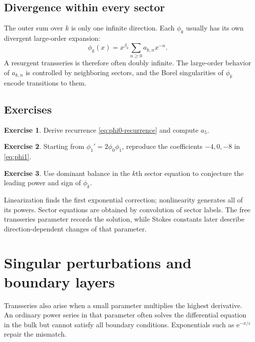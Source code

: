 \documentclass[11pt,openany]{book}
\theoremstyle{definition}
\newtheorem{exercise}{Exercise}[chapter]
\theoremstyle{plain}
\theoremstyle{remark}
\newcommand{\eps}{\varepsilon}
\newcommand{\e}{\mathrm{e}}
\begin{document}
\section{Divergence within every sector}

The outer sum over $k$ is only one infinite direction. Each $\phi_k$ usually has its own divergent large-order expansion:
\[
 \phi_k(x)=x^{\beta_k}\sum_{n\ge0}a_{k,n}x^{-n}.
\]
A resurgent transseries is therefore often doubly infinite. The large-order behavior of $a_{k,n}$ is controlled by neighboring sectors, and the Borel singularities of $\phi_k$ encode transitions to them.

\section{Exercises}

\begin{exercise}
Derive recurrence \cref{eq:phi0-recurrence} and compute $a_5$.
\end{exercise}

\begin{exercise}
Starting from $\phi_1'=2\phi_0\phi_1$, reproduce the coefficients $-4,0,-8$ in \cref{eq:phi1}.
\end{exercise}

\begin{exercise}
Use dominant balance in the $k$th sector equation to conjecture the leading power and sign of $\phi_k$.
\end{exercise}

\begin{summarybox}
Linearization finds the first exponential correction; nonlinearity generates all of its powers. Sector equations are obtained by convolution of sector labels. The free transseries parameter records the solution, while Stokes constants later describe direction-dependent changes of that parameter.
\end{summarybox}


\chapter{Singular perturbations and boundary layers}\label{ch:singular-perturbation}

Transseries also arise when a small parameter multiplies the highest derivative. An ordinary power series in that parameter often solves the differential equation in the bulk but cannot satisfy all boundary conditions. Exponentials such as $\e^{-x/\eps}$ repair the mismatch.
\end{document}
